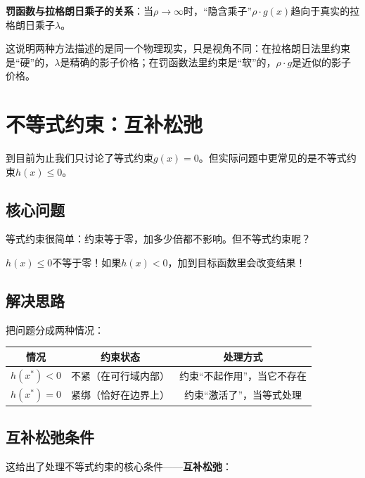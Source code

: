\begin{insightbox}
\textbf{罚函数与拉格朗日乘子的关系}：当$\rho \to \infty$时，“隐含乘子”$\rho \cdot g(x)$趋向于真实的拉格朗日乘子$\lambda$。

这说明两种方法描述的是同一个物理现实，只是视角不同：在拉格朗日法里约束是“硬”的，$\lambda$是精确的影子价格；在罚函数法里约束是“软”的，$\rho \cdot g$是近似的影子价格。
\end{insightbox}

\section{不等式约束：互补松弛}

到目前为止我们只讨论了等式约束$g(x) = 0$。但实际问题中更常见的是不等式约束$h(x) \leq 0$。

\subsection{核心问题}

等式约束很简单：约束等于零，加多少倍都不影响。但不等式约束呢？

$h(x) \leq 0$不等于零！如果$h(x) < 0$，加到目标函数里会改变结果！

\subsection{解决思路}

把问题分成两种情况：

\begin{center}
\begin{tabular}{c|c|c}
\toprule
\textbf{情况} & \textbf{约束状态} & \textbf{处理方式} \\
\midrule
$h(x^*) < 0$ & 不紧（在可行域内部） & 约束“不起作用”，当它不存在 \\
$h(x^*) = 0$ & 紧绑（恰好在边界上） & 约束“激活了”，当等式处理 \\
\bottomrule
\end{tabular}
\end{center}

\subsection{互补松弛条件}

这给出了处理不等式约束的核心条件——\textbf{互补松弛}：

\begin{center}
\end{center}

